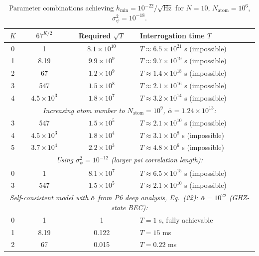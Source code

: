\documentclass[11pt]{article}
\theoremstyle{definition}
\theoremstyle{remark}
\newcommand{\hmin}{h_{\min}}
\begin{document}
\begin{table}[h!]
\centering
\caption{Parameter combinations achieving $\hmin = 10^{-22}/\sqrt{\mathrm{Hz}}$
for $N = 10$, $N_{\mathrm{atom}} = 10^6$, $\sigma_\psi^2 = 10^{-18}$.}
\label{tab:sensitivity-params}
\begin{tabular}{@{}ccc>{\raggedright\arraybackslash}p{6cm}@{}}
\toprule
$K$ & $67^{K/2}$ & Required $\sqrt{T}$ & Interrogation time $T$ \\
\midrule
0 & 1 & $8.1\times 10^{10}$ & $T \approx 6.5\times 10^{21}$ s (impossible) \\
1 & 8.19 & $9.9\times 10^{9}$ & $T \approx 9.7\times 10^{19}$ s (impossible) \\
2 & 67 & $1.2\times 10^{9}$ & $T \approx 1.4\times 10^{18}$ s (impossible) \\
3 & 547 & $1.5\times 10^{8}$ & $T \approx 2.1\times 10^{16}$ s (impossible) \\
4 & $4.5\times 10^3$ & $1.8\times 10^{7}$ & $T \approx 3.2\times 10^{14}$ s
(impossible) \\
\midrule
\multicolumn{4}{c}{\textit{Increasing atom number to $N_{\mathrm{atom}} = 10^9$,
$\bar{\alpha} = 1.24\times 10^{13}$:}} \\
\midrule
3 & 547 & $1.5\times 10^{5}$ & $T \approx 2.1\times 10^{10}$ s (impossible) \\
4 & $4.5\times 10^3$ & $1.8\times 10^{4}$ & $T \approx 3.1\times 10^8$ s
(impossible) \\
5 & $3.7\times 10^4$ & $2.2\times 10^{3}$ & $T \approx 4.8\times 10^6$ s
(impossible) \\
\midrule
\multicolumn{4}{c}{\textit{Using $\sigma_\psi^2 = 10^{-12}$ (larger psi
correlation length):}} \\
\midrule
0 & 1 & $8.1\times 10^7$ & $T \approx 6.5\times 10^{15}$ s (impossible) \\
3 & 547 & $1.5\times 10^5$ & $T \approx 2.1\times 10^{10}$ s (impossible) \\
\midrule
\multicolumn{4}{c}{\textit{Self-consistent model with $\bar\alpha$ from P6
deep analysis, Eq.~(22): $\bar\alpha = 10^{22}$ (GHZ-state BEC):}} \\
\midrule
0 & 1 & 1 & $T = 1$ s, fully achievable\\
1 & 8.19 & 0.122 & $T = 15$ ms\\
2 & 67 & 0.015 & $T = 0.22$ ms \\
\bottomrule
\end{tabular}
\end{table}
\end{document}
